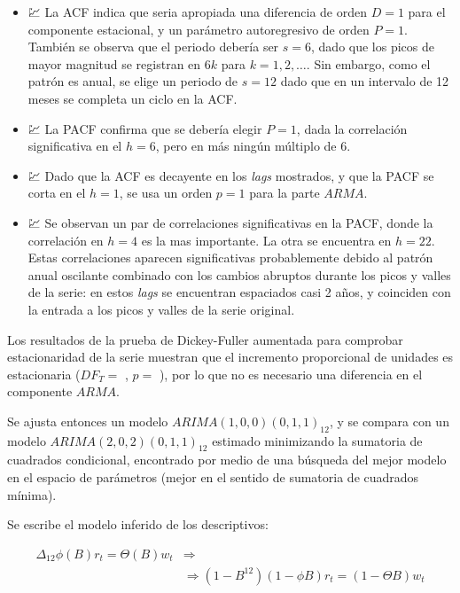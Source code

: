 \documentclass[]{article}
\providecommand{\tightlist}{%
  \setlength{\itemsep}{0pt}\setlength{\parskip}{0pt}}
\begin{document}
\begin{itemize}
\tightlist
\item
  💹 La ACF indica que seria apropiada una diferencia de orden \(D=1\) para el componente estacional, y un parámetro autoregresivo de orden \(P=1\). También se observa que el periodo debería ser \(s=6\), dado que los picos de mayor magnitud se registran en \(6k\) para \(k=1,2,\ldots\). Sin embargo, como el patrón es anual, se elige un periodo de \(s=12\) dado que en un intervalo de 12 meses se completa un ciclo en la ACF.
\item
  💹 La PACF confirma que se debería elegir \(P=1\), dada la correlación significativa en el \(h=6\), pero en más ningún múltiplo de 6.
\item
  💹 Dado que la ACF es decayente en los \emph{lags} mostrados, y que la PACF se corta en el \(h=1\), se usa un orden \(p=1\) para la parte \(ARMA\).
\item
  💹 Se observan un par de correlaciones significativas en la PACF, donde la correlación en \(h=4\) es la mas importante. La otra se encuentra en \(h=22\). Estas correlaciones aparecen significativas probablemente debido al patrón anual oscilante combinado con los cambios abruptos durante los picos y valles de la serie: en estos \emph{lags} se encuentran espaciados casi 2 años, y coinciden con la entrada a los picos y valles de la serie original.
\end{itemize}

Los resultados de la prueba de Dickey-Fuller aumentada para comprobar estacionaridad de la serie muestran que el incremento proporcional de unidades es estacionaria (\(DF_T =\) , \(p =\) ), por lo que no es necesario una diferencia en el componente \(ARMA\).

Se ajusta entonces un modelo \(ARIMA(1, 0, 0)(0, 1, 1)_{12}\), y se compara con un modelo \(ARIMA(2, 0, 2)(0, 1, 1)_{12}\) estimado minimizando la sumatoria de cuadrados condicional, encontrado por medio de una búsqueda del mejor modelo en el espacio de parámetros (mejor en el sentido de sumatoria de cuadrados mínima).

Se escribe el modelo inferido de los descriptivos:

\[
\begin{aligned}
  \Delta_{12}\phi(B)r_t = \Theta(B) w_t  & \Rightarrow \\
    & \Rightarrow (1 - B^12)(1 - \phi B) r_t = (1 - \Theta B) w_t \\
\end{aligned}
\]
\end{document}
